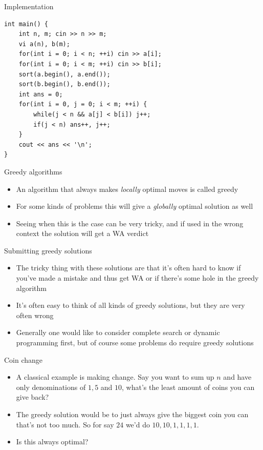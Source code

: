 \documentclass{beamer}
\begin{document}
\begin{frame}{Implementation}
\begin{verbatim}
int main() {
    int n, m; cin >> n >> m;
    vi a(n), b(m);
    for(int i = 0; i < n; ++i) cin >> a[i];
    for(int i = 0; i < m; ++i) cin >> b[i];
    sort(a.begin(), a.end());
    sort(b.begin(), b.end());
    int ans = 0;
    for(int i = 0, j = 0; i < m; ++i) {
        while(j < n && a[j] < b[i]) j++;
        if(j < n) ans++, j++;
    }
    cout << ans << '\n';
}
\end{verbatim}
\end{frame}

\begin{frame}[plain]{Greedy algorithms}
    \begin{itemize}
        \item An algorithm that always makes \textit{locally} optimal moves is called greedy
        \item For some kinds of problems this will give a \textit{globally} optimal solution as well
        \item Seeing when this is the case can be very tricky, and if used in the wrong context the solution will get a WA verdict
    \end{itemize}
\end{frame}

\begin{frame}[plain]{Submitting greedy solutions}
    \begin{itemize}
        \item The tricky thing with these solutions are that it's often hard to know if you've made a mistake and thus get WA or if there's some hole in the greedy algorithm
        \item It's often easy to think of all kinds of greedy solutions, but they are very often wrong
        \item Generally one would like to consider complete search or dynamic programming first, but of course some problems do require greedy solutions
    \end{itemize}
\end{frame}

\begin{frame}[plain]{Coin change}
    \begin{itemize}
        \item A classical example is making change. Say you want to sum up $n$ and have only denominations of $1, 5$ and $10$, what's the least amount of coins you can give back?
        \item The greedy solution would be to just always give the biggest coin you can that's not too much. So for say $24$ we'd do $10, 10, 1, 1, 1, 1$.
        \item Is this always optimal?
    \end{itemize}
\end{frame}
\end{document}
